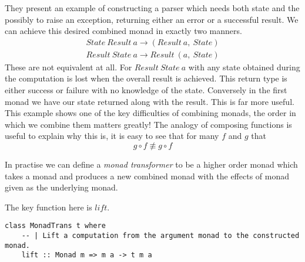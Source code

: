 They present an example of constructing a parser which needs both state
and the possibly to raise an exception,
returning either an error or a successful result.
We can achieve this desired combined monad in exactly two manners.
\begin{align}
    State\ Result\ a \rightarrow (Result\ a,\ State)\\
    Result\ State\ a \rightarrow Result\ (a,\ State)
\end{align}
These are not equivalent at all.
For $Result\ State\ a$ with any state obtained during the computation
is lost when the overall result is achieved.
This return type is either success or failure with no knowledge of the state.
Conversely in the first monad we have our state returned along with the result.
This is far more useful.
This example shows one of the key difficulties of combining monads,
the order in which we combine them matters greatly!
The analogy of composing functions is useful to explain why this is,
it is easy to see that for many $f$ and $g$ that
\begin{equation}
    g \circ f \not\equiv g \circ f
\end{equation}

In practise we can define a \textit{monad transformer}
to be a higher order monad which takes a monad
and produces a new combined monad with the effects of
monad given as the underlying monad.

The key function here is $lift$.
\begin{verbatim}
class MonadTrans t where
    -- | Lift a computation from the argument monad to the constructed monad.
    lift :: Monad m => m a -> t m a
\end{verbatim}


